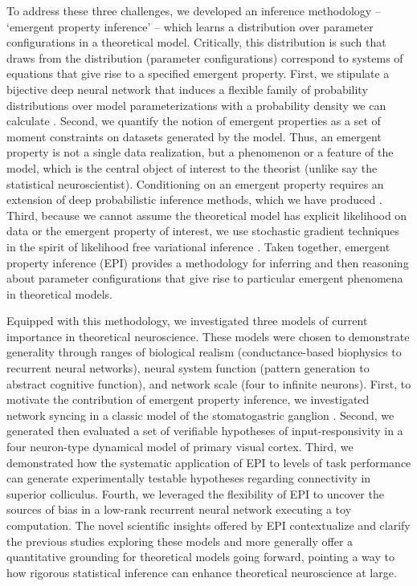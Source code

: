 \documentclass[11pt]{article}
\begin{document}
To address these three challenges, we developed an inference methodology -- `emergent property inference' -- which learns a distribution over parameter configurations in a theoretical model.  Critically, this distribution is such that draws from the distribution (parameter configurations) correspond to systems of equations that give rise to a specified emergent property.  
First, we stipulate a bijective deep neural network that induces a flexible family of probability distributions over model parameterizations with a probability density we can calculate \cite{rezende2015variational, dinh2016density, papamakarios2017masked}.
Second, we quantify the notion of emergent properties as a set of moment constraints on datasets generated by the model.  
Thus, an emergent property is not a single data realization, but a phenomenon or a feature of the model, which is the central object of interest to the theorist (unlike say the statistical neuroscientist).  
Conditioning on an emergent property requires an extension of deep probabilistic inference methods, which we have produced \cite{loaiza2017maximum}.
Third,  because we cannot assume the theoretical model has explicit likelihood on data or the emergent property of interest, we use stochastic gradient techniques in the spirit of likelihood free variational inference \cite{tran2017hierarchical}.    
Taken together, emergent property inference (EPI) provides a methodology for inferring and then reasoning about parameter configurations that give rise to particular emergent phenomena in theoretical models.

Equipped with this methodology, we investigated three models of current importance in theoretical neuroscience.
These models were chosen to demonstrate generality through ranges of biological realism (conductance-based biophysics to recurrent neural networks), neural system function (pattern generation to abstract cognitive function), and network scale (four to infinite neurons).
First, to motivate the contribution of emergent property inference, we investigated network syncing in a classic model of the stomatogastric ganglion \cite{gutierrez2013multiple}.   
Second, we generated then evaluated a set of verifiable hypotheses of input-responsivity in a four neuron-type dynamical model of primary visual cortex.
Third, we demonstrated how the systematic application of EPI to levels of task performance can generate experimentally testable hypotheses regarding connectivity in superior colliculus.  
Fourth, we leveraged the flexibility of EPI to uncover the sources of bias in a low-rank recurrent neural network executing a toy computation.  
The novel scientific insights offered by EPI contextualize and clarify the previous studies exploring these models \cite{gutierrez2013multiple, litwin2016inhibitory, duan2018collicular, mastrogiuseppe2018linking} and more generally offer a quantitative grounding for theoretical models  going forward, pointing a way to how rigorous statistical inference can enhance theoretical neuroscience at large.
\end{document}
